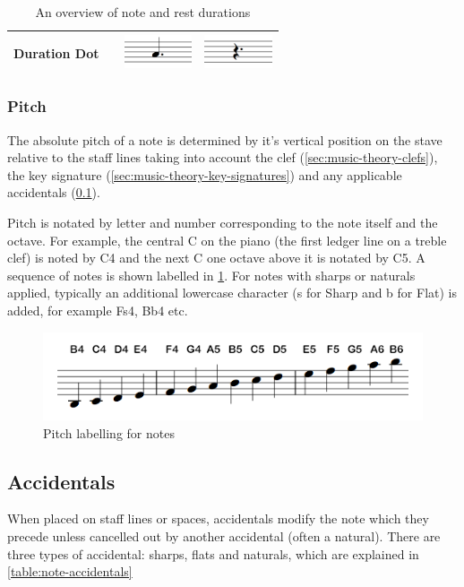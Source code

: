 \begin{table}[H]
\begin{tabularx}{.7\textwidth}{ llll }
        Duration Dot &              & \includegraphics[height=1cm]{gfx/music-theory/notehead-dotted.png}  & \includegraphics[height=1cm]{gfx/music-theory/rest-dotted.png} \\
        \bottomrule
    \end{tabularx}
    \caption{An overview of note and rest durations}
    \label{table:note-lengths}
\end{table}

\subsubsection{Pitch}
\label{sec:music-theory-pitch}

The absolute pitch of a note is determined by it's vertical position on the stave relative to the staff lines taking into account the clef (\cref{sec:music-theory-clefs}), the key signature (\cref{sec:music-theory-key-signatures}) and any applicable accidentals (\cref{sec:music-theory-accidentals}).

Pitch is notated by letter and number corresponding to the note itself and the octave. For example, the central C on the piano (the first ledger line on a treble clef) is noted by C4 and the next C one octave above it is notated by C5. A sequence of notes is shown labelled in \cref{fig:music-theory-pitch-labels}. For notes with sharps or naturals applied, typically an additional lowercase character (s for Sharp and b for Flat) is added, for example Fs4, Bb4 etc.

\begin{figure}[H]
  \centering
  \includegraphics[width=\linewidth]{gfx/music-theory/scale.png}
  \caption{Pitch labelling for notes}
  \label{fig:music-theory-pitch-labels}
\end{figure}

\subsection{Accidentals}
\label{sec:music-theory-accidentals}
When placed on staff lines or spaces, accidentals modify the note which they precede unless cancelled out by another accidental (often a natural). There are three types of accidental: sharps, flats and naturals, which are explained in \cref{table:note-accidentals}

